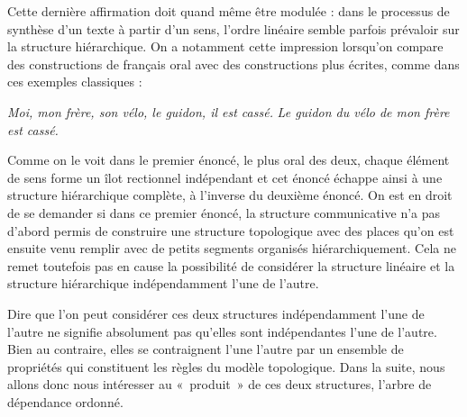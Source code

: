 {    Cette dernière affirmation doit quand même être modulée : dans le processus de synthèse d’un texte à partir d’un sens, l’ordre linéaire semble parfois prévaloir sur la structure hiérarchique. On a notamment cette impression lorsqu’on compare des constructions de français oral avec des constructions plus écrites, comme dans ces exemples classiques :

    \ea
    \ea  \textit{Moi, mon frère, son vélo, le guidon, il est cassé.}
    \ex  \textit{Le guidon du vélo de mon frère est cassé.}
    \z
    \z

    Comme on le voit dans le premier énoncé, le plus oral des deux, chaque élément de sens forme un îlot rectionnel indépendant et cet énoncé échappe ainsi à une structure hiérarchique complète, à l’inverse du deuxième énoncé. On est en droit de se demander si dans ce premier énoncé, la structure communicative n’a pas d’abord permis de construire une structure topologique avec des places qu’on est ensuite venu remplir avec de petits segments organisés hiérarchiquement. Cela ne remet toutefois pas en cause la possibilité de considérer la structure linéaire et la structure hiérarchique indépendamment l’une de l’autre.

    Dire que l’on peut considérer ces deux structures indépendamment l’une de l’autre ne signifie absolument pas qu’elles sont indépendantes l’une de l’autre. Bien au contraire, elles se contraignent l’une l’autre par un ensemble de propriétés qui constituent les règles du modèle topologique. Dans la suite, nous allons donc nous intéresser au «~produit~» de ces deux structures, l’arbre de dépendance ordonné.
}
